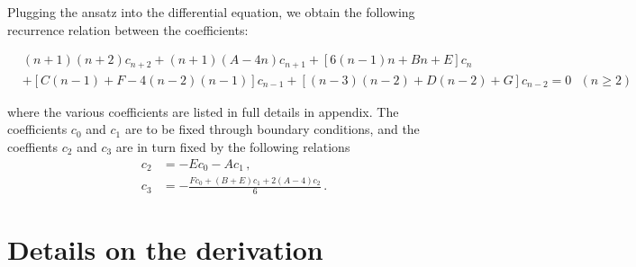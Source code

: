 \documentclass[reprint, amsmath, amssymb, aps, prl]{revtex4-2}
\begin{document}
    Plugging the ansatz into the differential equation, we obtain the following recurrence relation between the coefficients:
    \begin{widetext}
    \begin{equation}
    \begin{split}
        &(n+1)(n+2) c_{n+2}+(n+1)(A -4n)c_{n+1} +[6(n-1) n+B n+E]c_n \\
        &+[C (n-1)+F-4(n-2) (n-1)]c_{n-1} + [(n-3) (n-2)+D (n-2)+G]c_{n-2}=0\ \ \ (n\geq 2)
    \end{split}
    \end{equation}
    \end{widetext}
    where the various coefficients are listed in full details in appendix. The coefficients $c_0$ and $c_1$ are to be fixed through boundary conditions, and the coeffients $c_2$ and $c_3$ are in turn fixed by the following relations
    \begin{equation}
    \begin{split}
        c_2&=-Ec_0-Ac_1\,,\\
        c_3&=-\frac{ F c_0+(B+E)c_1 +2 (A-4)c_2 }{6}\,.
    \end{split}
    \end{equation}




\newpage

\appendix

\section{Details on the derivation}
\end{document}
